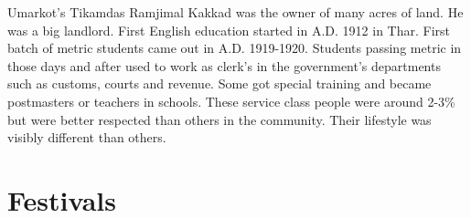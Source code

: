 Umarkot's Tikamdas Ramjimal Kakkad was the owner of many acres of land. He was a
big landlord. First English education started in A.D. 1912 in Thar. First batch
of metric students came out in A.D. 1919-1920. Students passing metric  in those
days and after used to work as clerk's in the government's departments such as
customs, courts and revenue. Some got special training and became postmasters or
teachers in schools. These service class people were around 2-3\% but were
better respected than others in the community. Their lifestyle was visibly
different than others.
\section{Festivals}
